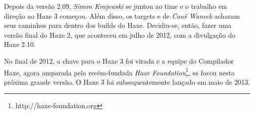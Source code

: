 Depois da versão 2.09, \emph{Simon Krajewski} se juntou ao time e o trabalho em direção ao Haxe 3 começou. Além disso, os targets  e  de \emph{Cauê Waneck} acharam seus caminhos para dentro dos builds do Haxe. Decidiu-se, então, fazer uma versão final do Haxe 2, que aconteceu em julho de 2012, com a divulgação do Haxe 2.10.

No final de 2012, a chave para o Haxe 3 foi virada e a equipe do Compilador Haxe, agora amparada pela recém-fundada \emph{Haxe Foundation}\footnote{http://haxe-foundation.org}, se focou nesta próxima grande versão. O Haxe 3 foi subsequentemente lançado em maio de 2013.

